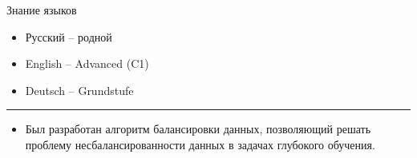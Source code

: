 \documentclass[a4paper,10pt]{article}
\newlength{\cvcolumngapwidth}
\newlength{\cvleftcolumnwidth}
\newlength{\cvrightcolumnwidth}
\newcommand{\cvsectionstyle}[1]{{\normalsize\cvsectionfont\textcolor{cvsectioncolor}{#1}}}
\newcommand{\cvheadingstyle}[1]{{\normalsize\cvheadingfont\textcolor{cvheadingcolor}{#1}}}
\newlength{\cvafteritemskipamount}
\newlength{\cvaftersectionskipamount}
\newlength{\cvbetweensectionandheadingextraskipamount}
\newlength{\cvparskip}
\newcommand{\cvsection}[1]{
    \begin{minipage}[t]{\cvleftcolumnwidth}
        \raggedleft\cvsectionstyle{#1}
    \end{minipage}%
    \hspace{\cvcolumngapwidth}%
    \begin{minipage}[t]{\cvrightcolumnwidth}
        \textcolor{cvrulecolor}{\rule{\cvrightcolumnwidth}{0.3mm}}
    \end{minipage}

    \vspace{\cvaftersectionskipamount}
}
\newcommand{\cvitem}[2]{
    \begin{minipage}[t]{\cvleftcolumnwidth}
        \raggedleft #1
    \end{minipage}%
    \hspace{\cvcolumngapwidth}%
    \begin{minipage}[t]{\cvrightcolumnwidth}
        \setlength{\parskip}{\cvparskip} #2
    \end{minipage}

    \vspace{\cvafteritemskipamount}
}
\begin{document}
\cvitem{
    \cvheadingstyle{Знание языков}
}{
    
    \begin{itemize}
        \item Русский -- родной
        \item English -- Advanced (C1)
        \item Deutsch -- Grundstufe
    \end{itemize}


}


\cvsection{Достижения}

\vspace{\cvbetweensectionandheadingextraskipamount}

\cvitem{
    \cvheadingstyle{}
}{
    \begin{itemize}
        \item Был разработан алгоритм балансировки данных, позволяющий решать \\ проблему несбалансированности данных в задачах глубокого обучения.
    \end{itemize}
}
\end{document}
